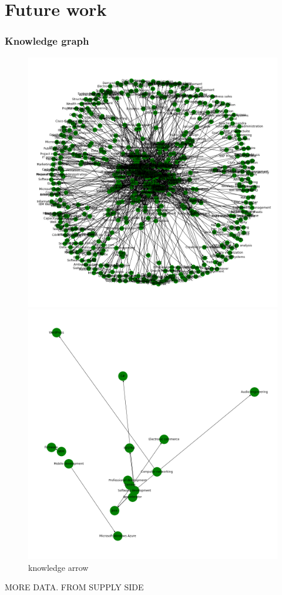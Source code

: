 \documentclass[10pt,mathserif]{beamer}
\begin{document}
\section{Future work}
	\begin{frame}
	\frametitle{Knowledge graph}
	\begin{figure}[h]
		
		\centering
		\begin{minipage}{.48\linewidth}
			\includegraphics[width=\linewidth]{./photos/knowlegegraphsmall.png}
			
			
		\end{minipage}
		\hfill
		\begin{minipage}{.48\linewidth}
			\includegraphics[width=.7\linewidth]{./photos/knowledgearrow2.png}
			
			
		\end{minipage}
		\caption{knowledge arrow}
		
	\end{figure}
MORE DATA. FROM SUPPLY SIDE 
\end{frame}
\end{document}
